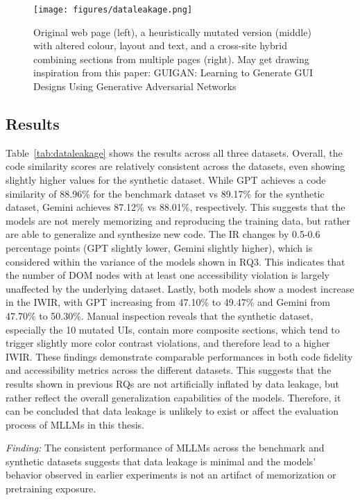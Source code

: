 \begin{figure}
  \centering
  \texttt{[image: figures/dataleakage.png]}
  \caption{Original web page (left), a heuristically mutated version (middle) with altered colour, layout and text, and a cross-site hybrid combining sections from multiple pages (right). May get drawing inspiration from this paper: GUIGAN: Learning to Generate GUI Designs Using Generative Adversarial Networks}
  \label{fig:dataleakagemutation} 
\end{figure}

\begingroup
    
\endgroup

\subsection{Results}
Table~\ref{tab:dataleakage} shows the results across all 
three datasets. Overall, the code similarity scores are 
relatively consistent across the datasets, even showing slightly 
higher values for the synthetic dataset. While GPT 
achieves a code similarity of 88.96\% for the benchmark dataset vs 
89.17\% for the synthetic dataset, Gemini
achieves 87.12\% vs 88.01\%, respectively. This 
suggests that the models are not merely memorizing and 
reproducing the training data, but rather are 
able to generalize and synthesize new code. The 
IR changes by 0.5-0.6 percentage points (GPT 
slightly lower, Gemini slightly higher), which is 
considered within the variance of the models 
shown in RQ3. This indicates that the number of 
DOM nodes with at least one accessibility violation 
is largely unaffected by the underlying dataset.
Lastly, both models show a modest increase in the 
IWIR, with GPT increasing from 47.10\% to 49.47\% 
and Gemini from 47.70\% to 50.30\%. Manual inspection 
reveals that the synthetic dataset, especially 
the 10 mutated UIs, contain more composite sections, 
which tend to trigger slightly more color 
contrast violations, and therefore lead 
to a higher IWIR.\newline
These findings demonstrate comparable performances 
in both code fidelity and accessibility metrics across
the different datasets. This suggests that the results 
shown in previous RQs are not artificially inflated 
by data leakage, but rather reflect the overall 
generalization capabilities of the models. Therefore,
it can be concluded that data leakage is unlikely to 
exist or affect the evaluation process of MLLMs in 
this thesis.

\begin{center}
\begin{tcolorbox}[colback=black!5!white,colframe=black!75!black,bottom=-0.05pt,top=-0.05pt]
\textit{Finding:} The consistent performance of 
MLLMs across the benchmark and synthetic datasets 
suggests that data leakage is minimal 
and the models' behavior observed in earlier 
experiments is not an artifact of memorization 
or pretraining exposure.
\end{tcolorbox}
\end{center}